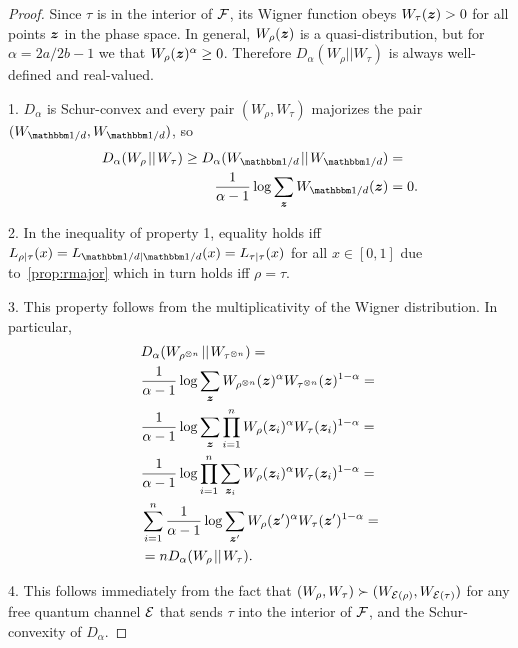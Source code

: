 \documentclass[pra,
aps,
twocolumn,
superscriptaddress,
groupedaddress,
nofootinbib,
reprint
]{revtex4-1}
\begin{document}
\begin{proof}
	Since $\tau$ is in the interior of ${\mathcal F}$, its Wigner function obeys $W_\tau(\bm{z}) >0$ for all points $\bm{z}$ in the phase space. 
In general, $W_\rho(\bm{z})$ is a quasi-distribution, but for $\alpha = 2a/2b-1$ we that $W_{\rho}(\bm{z})^\alpha \geq 0$. 
Therefore $D_\alpha (W_\rho || W_\tau)$ is always well-defined and real-valued.

1. $D_\alpha$ is Schur-convex and every pair $(W_{\rho}, W_{\tau})$ majorizes the pair $(W_{\I/d}, W_{\I/d})$, so
\begin{align}
	D_\alpha(W_{\rho} \hspace{1pt}||\hspace{1pt} W_{\tau}) \geq D_\alpha(W_{\I/d} \hspace{1pt}||\hspace{1pt} W_{\I/d}) &= \nonumber\\
	\frac{1}{\alpha-1} \log \sum_{\bmz} W_{\I/d}(\bmz) &= 0.
\end{align}

2. In the inequality of property 1, equality holds iff $L_{\rho|\tau}(x) = L_{\I/d|\I/d}(x) = L_{\tau|\tau}(x)$ for all $x\in [0,1]$ due to~\cref{prop:rmajor} which in turn holds iff $\rho = \tau$.

3. This property follows from the multiplicativity of the Wigner distribution.
In particular,
\begin{align}
	&D_\alpha(W_{\rho^{\otimes n}} \hspace{1pt}||\hspace{1pt} W_{\tau^{\otimes n}}) = \nonumber\\
	&\frac{1}{\alpha - 1} \log \sum_{\bm{z}} W_{\rho^{\otimes n}}(\bm{z})^\alpha W_{\tau^{\otimes n}}(\bm{z})^{1-\alpha} = \nonumber\\
	&\frac{1}{\alpha - 1} \log \sum_{\bm{z}} \prod_{i=1}^n W_{\rho}(\bm{z}_i)^\alpha W_{\tau}(\bm{z}_i)^{1-\alpha} = \nonumber\\
	&\frac{1}{\alpha - 1} \log \prod_{i=1}^n \sum_{\bm{z}_i} W_{\rho}(\bm{z}_i)^\alpha W_{\tau}(\bm{z}_i)^{1-\alpha} = \nonumber\\
	&\sum_{i=1}^n \frac{1}{\alpha - 1} \log \sum_{\bm{z}'} W_{\rho}(\bm{z}')^\alpha W_{\tau}(\bm{z}')^{1-\alpha} = \nonumber\\
	&= n D_{\alpha}(W_\rho \hspace{1pt}||\hspace{1pt} W_\tau).
\end{align}

4. This follows immediately from the fact that $(W_\rho, W_\tau) \succ (W_{{\mathcal E}(\rho)}, W_{{\mathcal E}(\tau)})$ for any free quantum channel ${\mathcal E}$ that sends $\tau$ into the interior of ${\mathcal F}$, and the Schur-convexity of $D_\alpha$.
\end{proof}
\end{document}
